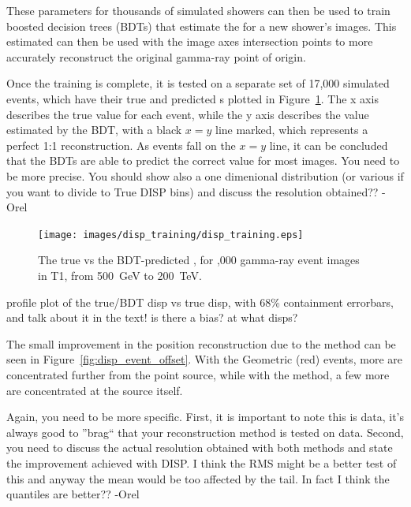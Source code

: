     These parameters for thousands of simulated showers can then be used to train boosted decision trees (BDTs) that estimate the \disp{} for a new shower's images.
    This estimated \disp{} can then be used with the image axes intersection points to more accurately reconstruct the original gamma-ray point of origin.
    
    Once the training is complete, it is tested on a separate set of 17,000 simulated events, which have their true and predicted \disp{}s plotted in Figure~\ref{fig:disptraining}.
    The x axis describes the true \disp{} value for each event, while the y axis describes the \disp{} value estimated by the BDT, with a black $x=y$ line marked, which represents a perfect 1:1 \disp{} reconstruction.
    As events fall on the $x=y$ line, it can be concluded that the BDTs are able to predict the correct \disp{} value for most images.
    {\color{red} You need to be more precise.  You should show also a one dimenional distribution (or various if you want to divide to True DISP bins) and discuss the resolution obtained?? -Orel}

    \begin{figure}[ht]
      \centering
      \texttt{[image: images/disp\_training/disp\_training.eps]}
      \caption[Disp BDT Training]{
        The true \disp{} vs the BDT-predicted \disp{}, for ,000 gamma-ray event images in T1, from \SI{500}{\GeV} to \SI{200}{\TeV}.
      }
      \label{fig:disptraining}
    \end{figure}
    
    {\color{red} profile plot of the true/BDT disp vs true disp, with 68\% containment errorbars, and talk about it in the text! is there a bias? at what disps? }

    The small improvement in the position reconstruction due to the \disp{} method can be seen in Figure~\ref{fig:disp_event_offset}.
    With the Geometric (red) events, more are concentrated further from the point source, while with the \disp{} method, a few more are concentrated at the source itself.
    
    {\color{red}Again, you need to be more specific. First, it is important to note this is data, it's always good to ''brag`` that your reconstruction method is tested on data.  Second, you need to discuss the actual resolution obtained with both methods and state the improvement achieved with DISP. I think the RMS might be a better test of this and anyway the mean would be too affected by the tail. In fact I think the quantiles are better?? -Orel}
    
